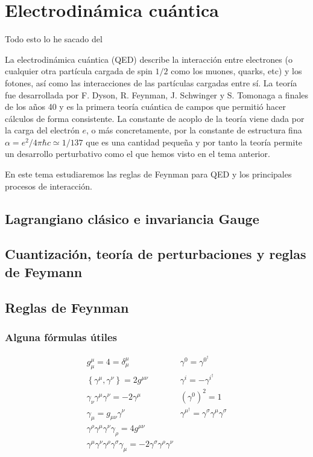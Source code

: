 \setchapterpreamble[u]{\margintoc}
\chapter{Electrodinámica cuántica}

\begin{center}
  \large Todo esto lo he sacado del \cite{Dobdado}
\end{center}
La electrodinámica cuántica (QED) describe la interacción entre electrones (o cualquier otra partícula cargada de spin $1 / 2$ como los muones, quarks, etc) y los fotones, así como las interacciones de las partículas cargadas entre sí. La teoría fue desarrollada por F. Dyson, R. Feynman, J. Schwinger y S. Tomonaga a finales de los años 40 y es la primera teoría cuántica de campos que permitió hacer cálculos de forma consistente. La constante de acoplo de la teoría viene dada por la carga del electrón $e$, o más concretamente, por la constante de estructura fina $\alpha=e^{2} / 4 \pi \hbar c \simeq 1 / 137$ que es una cantidad pequeña y por tanto la teoría permite un desarrollo perturbativo como el que hemos visto en el tema anterior.

En este tema estudiaremos las reglas de Feynman para QED y los principales procesos de interacción.
\section{Lagrangiano clásico e invariancia Gauge}
\section{Cuantización, teoría de perturbaciones y reglas de Feymann}
\section{Reglas de Feynman}
\subsection{Alguna fórmulas útiles}
\begin{equation}
  \begin{array}{ll}
  g_\mu^\mu=4=\delta_\mu^\mu & \gamma^0=\gamma^{0^ \dagger} \\
  \left\{\gamma^\mu, \gamma^\nu\right\}=2 g^{\mu \nu} & \gamma^i=-\gamma^{i ^\dagger} \\
  \gamma_\nu \gamma^\mu \gamma^\nu=-2 \gamma^\mu & \left(\gamma^0\right)^2=1 \\
  \gamma_{\mu}=g_{\mu\nu} \gamma^\nu &\gamma^{\mu^\dagger}=\gamma^\sigma \gamma^\mu \gamma^\sigma \\
  \gamma^\rho \gamma^\mu \gamma^\nu \gamma_\rho=4 g^{\mu \nu} & \\
  \gamma^\mu \gamma^\nu \gamma^\rho \gamma^\sigma \gamma_\mu=-2 \gamma^\sigma \gamma^\rho \gamma^\nu
  \end{array}
  \end{equation}


